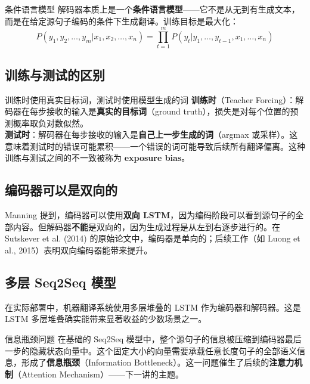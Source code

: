\documentclass[a4paper]{article}
\begin{document}
\begin{importantbox}{条件语言模型}
解码器本质上是一个\textbf{条件语言模型}——它不是从无到有生成文本，而是在给定源句子编码的条件下生成翻译。训练目标是最大化：
$$P(y_1, y_2, \ldots, y_m | x_1, x_2, \ldots, x_n) = \prod_{t=1}^{m} P(y_t | y_1, \ldots, y_{t-1}, x_1, \ldots, x_n)$$
\end{importantbox}

\subsection{训练与测试的区别}

\begin{warningbox}{训练时使用真实目标词，测试时使用模型生成的词}
\textbf{训练时}（Teacher Forcing）：解码器在每步接收的输入是\textbf{真实的目标词}（ground truth），损失是对每个位置的预测概率取负对数似然。\\
\textbf{测试时}：解码器在每步接收的输入是\textbf{自己上一步生成的词}（argmax 或采样）。这意味着测试时的错误可能累积——一个错误的词可能导致后续所有翻译偏离。这种训练与测试之间的不一致被称为 \textbf{exposure bias}。
\end{warningbox}

\subsection{编码器可以是双向的}

Manning 提到，编码器可以使用\textbf{双向 LSTM}，因为编码阶段可以看到源句子的全部内容。但解码器\textbf{不能}是双向的，因为生成过程是从左到右逐步进行的。在 Sutskever et al. (2014) 的原始论文中，编码器是单向的；后续工作（如 Luong et al., 2015）表明双向编码器能带来提升。

\subsection{多层 Seq2Seq 模型}





在实际部署中，机器翻译系统使用多层堆叠的 LSTM 作为编码器和解码器。这是 LSTM 多层堆叠确实能带来显著收益的少数场景之一。

\begin{knowledgebox}{信息瓶颈问题}
在基础的 Seq2Seq 模型中，整个源句子的信息被压缩到编码器最后一步的隐藏状态向量中。这个固定大小的向量需要承载任意长度句子的全部语义信息，形成了\textbf{信息瓶颈}（Information Bottleneck）。这一问题催生了后续的\textbf{注意力机制}（Attention Mechanism）——下一讲的主题。
\end{knowledgebox}
\end{document}

